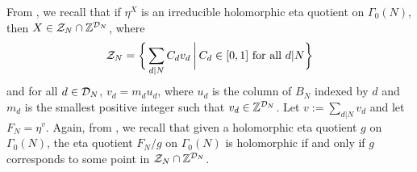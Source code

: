 \documentclass[a4paper,11pt]{amsart}
\begin{document}
From \cite{B-four}, we recall that if $\eta^X$ is an irreducible holomorphic eta quotient on $\Gamma_0(N)$,
then $X\in\mathcal{Z}_N\cap\mathbb{Z}^{\mathcal{D}_N}$, where 
\begin{equation}
\mathcal{Z}_N=\bigg{\{}\sum_{d|N}C_dv_d\hspace{2pt}\bigg{|}\hspace{2pt}C_d\in[0,1]\text{ for all } d|N\bigg{\}} 
\end{equation}
and for all $d\in \mathcal{D}_N$, $v_d=m_du_d$, where $u_d$ is the column of $B_N$ indexed by $d$ and $m_d$ is the smallest
positive integer such that $v_d\in\mathbb{Z}^{\mathcal{D}_N}$.  Let $v:=\sum_{d|N}v_d$ and let $F_N=\eta^v$.
Again, from \cite{B-four}, we recall 
that %
given a holomorphic eta quotient $g$ on $\Gamma_0(N)$,  the eta quotient 
$F_N/g$ \hspace{2pt}on $\Gamma_0(N)$ is holomorphic if and only if $g$ corresponds to some point in  $\mathcal{Z}_N\cap\mathbb{Z}^{\mathcal{D}_N}$.
\end{document}
